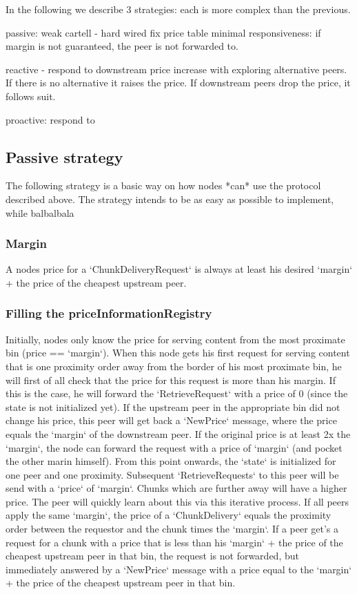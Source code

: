 In the following we describe 3 strategies: each is more complex than the previous.

passive: weak cartell - hard wired fix price table
minimal responsiveness: if margin is not guaranteed, the peer is not forwarded to. 

reactive - respond to downstream price increase with exploring alternative peers. If there is no alternative it raises the price. If downstream peers drop the price, it follows suit.

proactive: respond to 


\subsection{Passive strategy \statusorange}\label{sec:pricing-retrieval}
The following strategy is a basic way on how nodes *can* use the protocol described above. The strategy intends to be as easy as possible to implement, while balbalbala

\subsubsection{Margin}
A nodes price for a `ChunkDeliveryRequest` is always at least his desired `margin` + the price of the cheapest upstream peer. 

\subsubsection{Filling the priceInformationRegistry}
Initially, nodes only know the price for serving content from the most proximate bin (price == `margin`). When this node gets his first request for serving content that is one proximity order away from the border of his most proximate bin, he will first of all check that the price for this request is more than his margin. If this is the case, he will forward the `RetrieveRequest` with a price of 0 (since the state is not initialized yet). If the upstream peer in the appropriate bin did not change his price, this peer will get back a `NewPrice` message, where the price equals the `margin` of the downstream peer. If the original price is at least 2x the `margin`, the node can forward the request with a price of `margin` (and pocket the other marin himself). From this point onwards, the `state` is initialized for one peer and one proximity. Subsequent `RetrieveRequests` to this peer will be send with a `price` of `margin`. Chunks which are further away will have a higher price. The peer will quickly learn about this via this iterative process. If all peers apply the same `margin`, the price of a `ChunkDelivery` equals the proximity order between the requestor and the chunk times the `margin`. If a peer get's a request for a chunk with a price that is less than his `margin` + the price of the cheapest upstream peer in that bin, the request is not forwarded, but immediately answered by a `NewPrice` message with a price equal to the `margin` + the price of the cheapest upstream peer in that bin.

